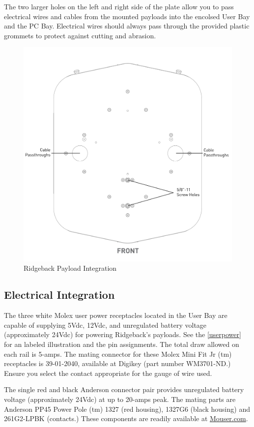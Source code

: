 \documentclass[]{clearpath-latex/clearpath-manual}
\begin{document}
The two larger holes on the left and right side of the plate allow you to pass electrical wires and cables from the mounted payloads into the encolsed User Bay and the PC Bay.  Electrical wires should always pass through the provided plastic grommets to protect against cutting and abrasion. 

\begin{figure}[!htb]
  \centering
  \includegraphics[width=0.75\linewidth]{Payload_Integration_Plate.pdf}
  \caption{Ridgeback Payload Integration}
  \label{payloadplate}
\end{figure}

\subsection{Electrical Integration}
\label{electrical}

The three white Molex user power receptacles located in the User Bay are capable of supplying 5Vdc, 12Vdc, and unregulated battery voltage (approximately 24Vdc) for powering Ridgeback's payloads. See the \autoref{userpower} for an labeled illustration and the pin assignments. The total draw allowed on each rail is 5-amps. The mating connector for these Molex Mini Fit Jr (tm) receptacles is 39-01-2040, available at Digikey (part number WM3701-ND.) Ensure you select the contact appropriate for the gauge of wire used. 

The single red and black Anderson connector pair provides unregulated battery voltage (approximately 24Vdc) at up to 20-amps peak. The mating parts are Anderson PP45 Power Pole (tm) 1327 (red housing), 1327G6 (black housing) and 261G2-LPBK (contacts.) These components are readily available at \url{Mouser.com}.
\end{document}
